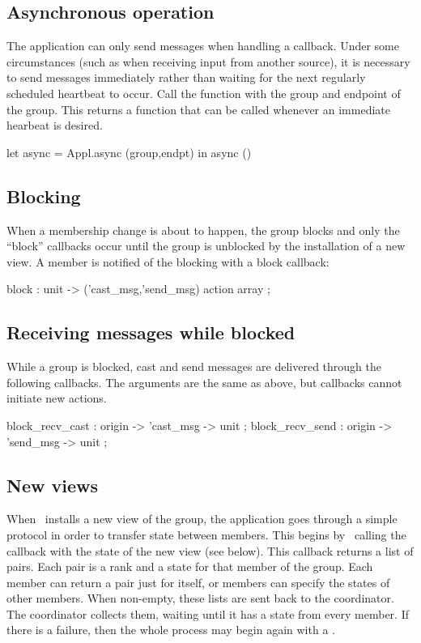 \subsection{Asynchronous operation}
The application can only send messages when handling a callback.  Under some
circumstances (such as when receiving input from another source), it is necessary to
send messages immediately rather than waiting for the next regularly scheduled
heartbeat to occur.  Call the function  with the group and endpoint
of the group.  This returns a function that can be called whenever an immediate
hearbeat is desired.
\begin{codebox}
  let async = Appl.async (group,endpt) in
  async ()
\end{codebox}

\subsection{Blocking}
When a membership change is about to happen, the group blocks and only the
``block'' callbacks occur until the group is unblocked by the installation
of a new view.  A member is notified of the blocking with a block callback:
\begin{codebox}
  block                 : unit ->
    ('cast_msg,'send_msg) action array ;
\end{codebox}

\subsection{Receiving messages while blocked}
While a group is blocked, cast and send messages are delivered through the
following callbacks.  The arguments are the same as above, but callbacks cannot
initiate new actions.
\begin{codebox}
  block_recv_cast       : origin -> 'cast_msg -> unit ;
  block_recv_send       : origin -> 'send_msg -> unit ;
\end{codebox}

\subsection{New views}
When \ensemble\ installs a new view of the group, the application goes through a
simple protocol in order to transfer state between members.  This begins by
\ensemble\ calling the  callback with the state of the new view
(see below).  This callback returns a list of pairs.  Each pair is a rank and a state
for that member of the group.  Each member can return a pair just for itself, or
members can specify the states of other members.  When non-empty, these lists are
sent back to the coordinator.  The coordinator collects them, waiting until it has a
state from every member.  If there is a failure, then the whole process may begin
again with a .

